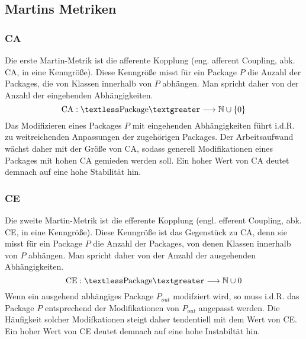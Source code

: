\documentclass[12pt]{article}
\begin{document}
\subsection{Martins Metriken}

\subsubsection{CA}\label{CA}

Die erste Martin-Metrik ist die afferente Kopplung (eng. afferent
Coupling, abk. CA, in \cite{Sne10} eine Kenngröße).
Diese Kenngröße misst für ein Package $P$ die Anzahl der Packages,
die von Klassen innerhalb von $P$ abhängen. Man spricht daher von
der Anzahl der eingehenden Abhängigkeiten.
\[
        \text{CA}: \textless \text{Package} \textgreater
        \longrightarrow \mathbb{N} \cup \left\{ 0 \right\} 
\]
Das Modifizieren eines Packages $P$ mit eingehenden
Abhängigkeiten führt i.d.R. zu weitreichenden Anpassungen der
zugehörigen Packages. Der Arbeitsaufwand wächst daher mit der Größe von
CA, sodass generell Modifikationen eines Packages mit hohen CA
gemieden werden soll.  Ein hoher Wert von CA deutet demnach auf
eine hohe Stabilität hin.


\subsubsection{CE}\label{CE}

Die zweite Martin-Metrik ist die efferente Kopplung (engl.
efferent Coupling, abk. CE, in \cite{Sne10} eine Kenngröße).
Diese Kenngröße ist das Gegenstück zu CA, denn sie misst für ein
Package $P$ die Anzahl der Packages, von denen Klassen innerhalb
von $P$ abhängen. Man spricht daher von der Anzahl der
ausgehenden Abhängigkeiten.
\[
        \text{CE}: \textless \text{Package} \textgreater \longrightarrow \mathbb{N} \cup 0
\]
Wenn ein ausgehend abhängiges Package $P_{out}$ modifziert wird,
so muss i.d.R. das Package $P$ entsprechend der Modifikationen
von $P_{out}$ angepasst werden. Die Häufigkeit solcher
Modifkationen steigt daher tendentiell mit dem Wert
von CE. Ein hoher Wert von CE deutet demnach auf eine hohe
Instabiltät hin.
\end{document}
